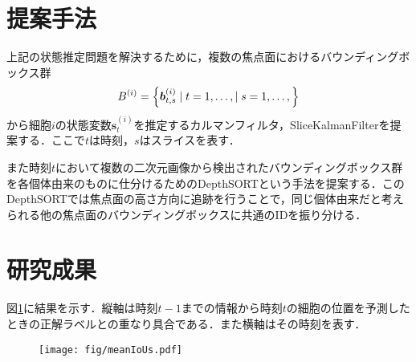 \section{提案手法}

上記の状態推定問題を解決するために，複数の焦点面におけるバウンディングボックス群
\begin{equation}
    \notag
    B^{(i)} = \left\{\bm{b}_{t,s}^{(i)} \mid t = 1,\dots, \mid s = 1, \dots,\right\}
\end{equation}
から細胞$i$の状態変数$\bm{s}_t^{(i)}$を推定するカルマンフィルタ，SliceKalmanFilterを提案する．ここで$t$は時刻，$s$はスライスを表す．

また時刻$t$において複数の二次元画像から検出されたバウンディングボックス群を各個体由来のものに仕分けるためのDepthSORTという手法を提案する．このDepthSORTでは焦点面の高さ方向に追跡を行うことで，同じ個体由来だと考えられる他の焦点面のバウンディングボックスに共通のIDを振り分ける．

\section{研究成果}

図\ref{fig:meanIoU}に結果を示す．縦軸は時刻$t-1$までの情報から時刻$t$の細胞の位置を予測したときの正解ラベルとの重なり具合である．また横軸はその時刻を表す．

\begin{figure}[h]
    \centering
    \texttt{[image: fig/meanIoUs.pdf]}
    \label{fig:meanIoU}
\end{figure}
